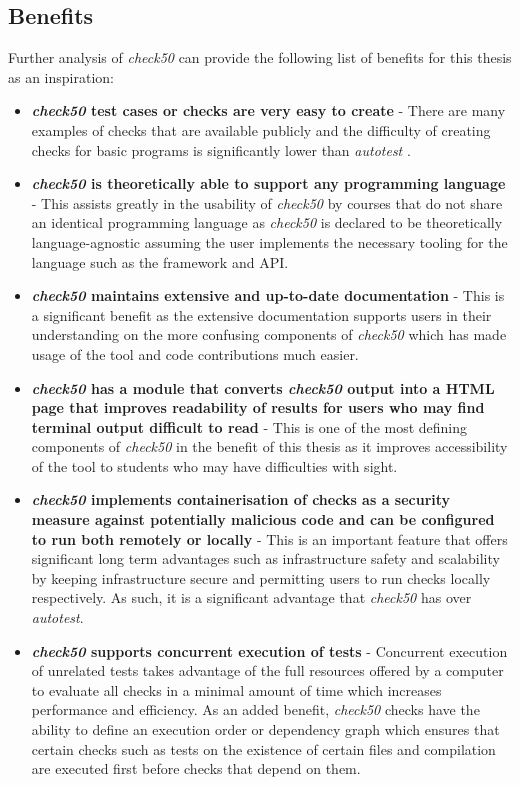 \documentclass[hidelinks, 12pt]{extreport}
\begin{document}
\subsection{Benefits}

Further analysis of \textit{check50} can provide the following list of benefits for this thesis as an inspiration:
\begin{itemize}
	\item \textbf{\textit{check50} test cases or checks are very easy to create} - There are many examples of checks that are available publicly and the difficulty of creating checks for basic programs is significantly lower than \textit{autotest} \cite{check50Examples}.
	\item \textbf{\textit{check50} is theoretically able to support any programming language} - This assists greatly in the usability of \textit{check50} by courses that do not share an identical programming language as \textit{check50} is declared to be theoretically language-agnostic assuming the user implements the necessary tooling for the language such as the framework and API.
	\item \textbf{\textit{check50} maintains extensive and up-to-date documentation} - This is a significant benefit as the extensive documentation supports users in their understanding on the more confusing components of \textit{check50} which has made usage of the tool and code contributions much easier.
	\item \textbf{\textit{check50} has a module that converts \textit{check50} output into a HTML page that improves readability of results for users who may find terminal output difficult to read} - This is one of the most defining components of \textit{check50} in the benefit of this thesis as it improves accessibility of the tool to students who may have difficulties with sight.
	\item \textbf{\textit{check50} implements containerisation of checks as a security measure against potentially malicious code and can be configured to run both remotely or locally} - This is an important feature that offers significant long term advantages such as infrastructure safety and scalability by keeping infrastructure secure and permitting users to run checks locally respectively. As such, it is a significant advantage that \textit{check50} has over \textit{autotest}.
	\item \textbf{\textit{check50} supports concurrent execution of tests} - Concurrent execution of unrelated tests takes advantage of the full resources offered by a computer to evaluate all checks in a minimal amount of time which increases performance and efficiency. As an added benefit, \textit{check50} checks have the ability to define an execution order or dependency graph which ensures that certain checks such as tests on the existence of certain files and compilation are executed first before checks that depend on them. 
\end{itemize} 
\end{document}
